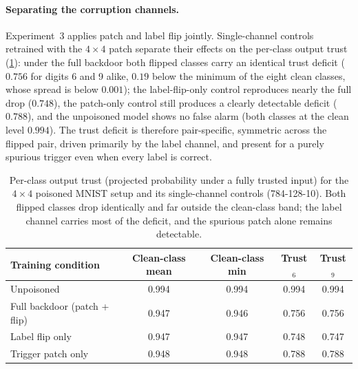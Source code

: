 \paragraph*{Separating the corruption channels.}
Experiment~3 applies patch and label flip jointly. Single-channel controls retrained with the $4\times4$ patch separate their effects on the per-class output trust (\cref{tab:diss-classtrust}): under the full backdoor both flipped classes carry an identical trust deficit ($0.756$ for digits 6 and 9 alike, $0.19$ below the minimum of the eight clean classes, whose spread is below $0.001$); the label-flip-only control reproduces nearly the full drop ($0.748$), the patch-only control still produces a clearly detectable deficit ($0.788$), and the unpoisoned model shows no false alarm (both classes at the clean level $0.994$). The trust deficit is therefore pair-specific, symmetric across the flipped pair, driven primarily by the label channel, and present for a purely spurious trigger even when every label is correct.

\begin{table}[ht]
\centering
\begin{tabular}{lcccc}
\hline
Training condition & Clean-class mean & Clean-class min & Trust$_6$ & Trust$_9$ \\
\hline
Unpoisoned & 0.994 & 0.994 & 0.994 & 0.994 \\
Full backdoor (patch + flip) & 0.947 & 0.946 & 0.756 & 0.756 \\
Label flip only & 0.947 & 0.947 & 0.748 & 0.747 \\
Trigger patch only & 0.948 & 0.948 & 0.788 & 0.788 \\
\hline
\end{tabular}
\caption{Per-class output trust (projected probability under a fully trusted input) for the $4\times4$ poisoned MNIST setup and its single-channel controls (784-128-10). Both flipped classes drop identically and far outside the clean-class band; the label channel carries most of the deficit, and the spurious patch alone remains detectable.}
\label{tab:diss-classtrust}
\end{table}

